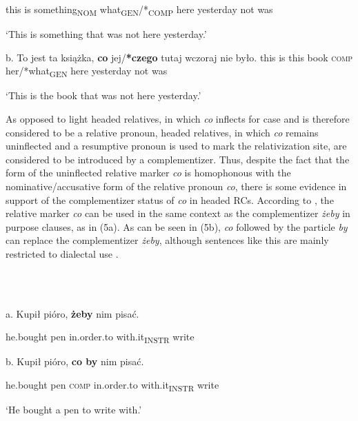 \documentclass[output=paper]{langsci/langscibook}
\begin{document}
    this   is   something\textsubscript{NOM}   what\textsubscript{GEN}/*\textsubscript{COMP}  here  yesterday  not   was

 ‘This is something that was not here yesterday.’

  b.   To   jest   ta   książka,   \textbf{co}   jej/\textbf{*czego}   tutaj  wczoraj   nie  było.        this   is   this   book   \textsc{comp}   her/*what\textsubscript{GEN}   here   yesterday  not  was

    ‘This is the book that was not here yesterday.’

As opposed to light headed relatives, in which \textit{co} inflects for case and is therefore considered to be a relative pronoun, headed relatives, in which \textit{co} remains uninflected and a resumptive pronoun is used to mark the relativization site, are considered to be introduced by a complementizer. Thus, despite the fact that the form of the uninflected relative marker \textit{co} is homophonous with the nominative/accusative form of the relative pronoun \textit{co}, there is some evidence in support of the complementizer status of \textit{co} in headed RCs. According to \citet{Bondaruk1995}, the relative marker \textit{co} can be used in the same context as the complementizer \textit{żeby} in purpose clauses, as in (5a). As can be seen in (5b), \textit{co} followed by the particle \textit{by} can replace the complementizer \textit{żeby}, although sentences like this are mainly restricted to dialectal use \citep[35]{Bondaruk1995}.

\ea%
    \label{ex:key:5}
    \gll\\
        \\
    \glt
    \z

          a.  Kupił   pióro,  \textbf{żeby} nim   pisać.

he.bought   pen   in.order.to   with.it\textsubscript{INSTR}  write

  b.   Kupił   pióro,   \textbf{co   by}   nim   pisać.

    he.bought   pen   \textsc{comp} in.order.to   with.it\textsubscript{INSTR}  write

‘He bought a pen to write with.’
\end{document}
